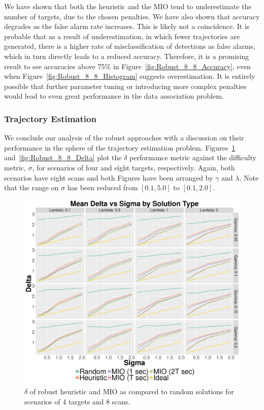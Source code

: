 We have shown that both the heuristic and the MIO tend to underestimate the number of targets, due to the chosen penalties. We have also shown that accuracy degrades as the false alarm rate increases. This is likely not a coincidence. It is probable that as a result of underestimation, in which fewer trajectories are generated, there is a higher rate of misclassification of detections as false alarms, which in turn directly leads to a reduced accuracy. Therefore, it is a promising result to see accuracies above 75\% in Figure~\ref{fig:Robust_8_8_Accuracy}, even when Figure~\ref{fig:Robust_8_8_Histogram} suggests overestimation. It is entirely possible that further parameter tuning or introducing more complex penalties would lead to even great performance in the data association problem.

\subsubsection{Trajectory Estimation}
We conclude our analysis of the robust approaches with a discussion on their performance in the sphere of the trajectory estimation problem. Figures~\ref{fig:Robust_4_8_Delta} and~\ref{fig:Robust_8_8_Delta} plot the $\delta$ performance metric against the difficulty metric, $\sigma$, for scenarios of four and eight targets, respectively. Again, both scenarios have eight scans and both Figures have been arranged by $\gamma$ and $\lambda$. Note that the range on $\sigma$ has been reduced from $[0.1,5.0]$ to $[0.1, 2.0]$. 

\begin{figure}[ht]
  \centering
  \includegraphics[width=\columnwidth]{../Figures/4_8_Delta}
  \caption{$\delta$ of robust heuristic and MIO as compared to random solutions for scenarios of 4 targets and 8 scans.}
  \label{fig:Robust_4_8_Delta}
\end{figure}

